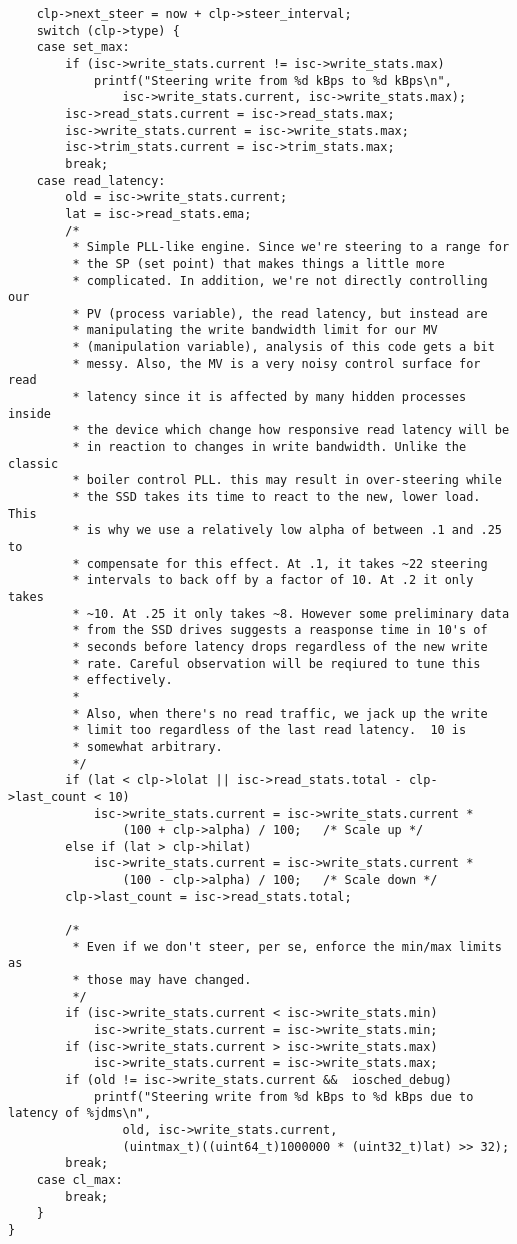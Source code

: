 \documentclass[10pt,conference,draftclsnofoot,onecolumn]{IEEEtran}
\begin{document}
\begin{appendices}
\begin{lstlisting}
	clp->next_steer = now + clp->steer_interval;
	switch (clp->type) {
	case set_max:
		if (isc->write_stats.current != isc->write_stats.max)
			printf("Steering write from %d kBps to %d kBps\n",
			    isc->write_stats.current, isc->write_stats.max);
		isc->read_stats.current = isc->read_stats.max;
		isc->write_stats.current = isc->write_stats.max;
		isc->trim_stats.current = isc->trim_stats.max;
		break;
	case read_latency:
		old = isc->write_stats.current;
		lat = isc->read_stats.ema;
		/*
		 * Simple PLL-like engine. Since we're steering to a range for
		 * the SP (set point) that makes things a little more
		 * complicated. In addition, we're not directly controlling our
		 * PV (process variable), the read latency, but instead are
		 * manipulating the write bandwidth limit for our MV
		 * (manipulation variable), analysis of this code gets a bit
		 * messy. Also, the MV is a very noisy control surface for read
		 * latency since it is affected by many hidden processes inside
		 * the device which change how responsive read latency will be
		 * in reaction to changes in write bandwidth. Unlike the classic
		 * boiler control PLL. this may result in over-steering while
		 * the SSD takes its time to react to the new, lower load. This
		 * is why we use a relatively low alpha of between .1 and .25 to
		 * compensate for this effect. At .1, it takes ~22 steering
		 * intervals to back off by a factor of 10. At .2 it only takes
		 * ~10. At .25 it only takes ~8. However some preliminary data
		 * from the SSD drives suggests a reasponse time in 10's of
		 * seconds before latency drops regardless of the new write
		 * rate. Careful observation will be reqiured to tune this
		 * effectively.
		 *
		 * Also, when there's no read traffic, we jack up the write
		 * limit too regardless of the last read latency.  10 is
		 * somewhat arbitrary.
		 */
		if (lat < clp->lolat || isc->read_stats.total - clp->last_count < 10)
			isc->write_stats.current = isc->write_stats.current *
			    (100 + clp->alpha) / 100;	/* Scale up */
		else if (lat > clp->hilat)
			isc->write_stats.current = isc->write_stats.current *
			    (100 - clp->alpha) / 100;	/* Scale down */
		clp->last_count = isc->read_stats.total;

		/*
		 * Even if we don't steer, per se, enforce the min/max limits as
		 * those may have changed.
		 */
		if (isc->write_stats.current < isc->write_stats.min)
			isc->write_stats.current = isc->write_stats.min;
		if (isc->write_stats.current > isc->write_stats.max)
			isc->write_stats.current = isc->write_stats.max;
		if (old != isc->write_stats.current && 	iosched_debug)
			printf("Steering write from %d kBps to %d kBps due to latency of %jdms\n",
			    old, isc->write_stats.current,
			    (uintmax_t)((uint64_t)1000000 * (uint32_t)lat) >> 32);
		break;
	case cl_max:
		break;
	}
}
\end{lstlisting}
\end{appendices}
\end{document}
